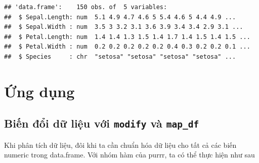 \documentclass[]{krantz}
\makeatletter
\newenvironment{Shaded}{\begin{snugshade}}{\end{snugshade}}
\newcommand{\CommentTok}[1]{\textcolor[rgb]{0.37,0.37,0.37}{\textit{#1}}}
\newcommand{\ControlFlowTok}[1]{\textcolor[rgb]{0.27,0.27,0.27}{\textbf{#1}}}
\newcommand{\DecValTok}[1]{\textcolor[rgb]{0.06,0.06,0.06}{#1}}
\newcommand{\KeywordTok}[1]{\textcolor[rgb]{0.27,0.27,0.27}{\textbf{#1}}}
\newcommand{\NormalTok}[1]{#1}
\newcommand{\OperatorTok}[1]{\textcolor[rgb]{0.43,0.43,0.43}{\textbf{#1}}}
\newcommand{\StringTok}[1]{\textcolor[rgb]{0.5,0.5,0.5}{#1}}
\newenvironment{kframe}{%
\medskip{}
\setlength{\fboxsep}{.8em}
 \def\at@end@of@kframe{}%
 \ifinner\ifhmode%
  \def\at@end@of@kframe{\end{minipage}}%
  \begin{minipage}{\columnwidth}%
 \fi\fi%
 \def\FrameCommand##1{\hskip\@totalleftmargin \hskip-\fboxsep
 \colorbox{shadecolor}{##1}\hskip-\fboxsep
     \hskip-\linewidth \hskip-\@totalleftmargin \hskip\columnwidth}%
 \MakeFramed {\advance\hsize-\width
   \@totalleftmargin\z@ \linewidth\hsize
   \@setminipage}}%
 {\par\unskip\endMakeFramed%
 \at@end@of@kframe}
\renewenvironment{Shaded}{\begin{kframe}}{\end{kframe}}
\renewenvironment{Shaded}{\begin{snugshade}}{\end{snugshade}}
\renewcommand{\CommentTok}[1]{\textcolor[rgb]{0.56,0.35,0.01}{\textit{#1}}}
\renewcommand{\ControlFlowTok}[1]{\textcolor[rgb]{0.13,0.29,0.53}{\textbf{#1}}}
\renewcommand{\DecValTok}[1]{\textcolor[rgb]{0.00,0.00,0.81}{#1}}
\renewcommand{\KeywordTok}[1]{\textcolor[rgb]{0.13,0.29,0.53}{\textbf{#1}}}
\renewcommand{\NormalTok}[1]{#1}
\renewcommand{\OperatorTok}[1]{\textcolor[rgb]{0.81,0.36,0.00}{\textbf{#1}}}
\renewcommand{\StringTok}[1]{\textcolor[rgb]{0.31,0.60,0.02}{#1}}
\theoremstyle{definition}
\theoremstyle{definition}
\theoremstyle{definition}
\theoremstyle{remark}
\makeatother
\begin{document}
\begin{Shaded}
\end{Shaded}

\begin{verbatim}
## 'data.frame':    150 obs. of  5 variables:
##  $ Sepal.Length: num  5.1 4.9 4.7 4.6 5 5.4 4.6 5 4.4 4.9 ...
##  $ Sepal.Width : num  3.5 3 3.2 3.1 3.6 3.9 3.4 3.4 2.9 3.1 ...
##  $ Petal.Length: num  1.4 1.4 1.3 1.5 1.4 1.7 1.4 1.5 1.4 1.5 ...
##  $ Petal.Width : num  0.2 0.2 0.2 0.2 0.2 0.4 0.3 0.2 0.2 0.1 ...
##  $ Species     : chr  "setosa" "setosa" "setosa" "setosa" ...
\end{verbatim}

\hypertarget{ng-dung}{%
\section{Ứng dụng}\label{ng-dung}}

\hypertarget{bin-i-d-liu-vi-modify-va-map_df}{%
\subsection{\texorpdfstring{Biến đổi dữ liệu với \texttt{modify} và
\texttt{map\_df}}{Biến đổi dữ liệu với modify và map\_df}}\label{bin-i-d-liu-vi-modify-va-map_df}}

Khi phân tích dữ liệu, đôi khi ta cần chuẩn hóa dữ liệu cho tất cả các
biến numeric trong data.frame. Với nhóm hàm của purrr, ta có thể thực
hiện như sau

\begin{Shaded}
\end{Shaded}
\end{document}
